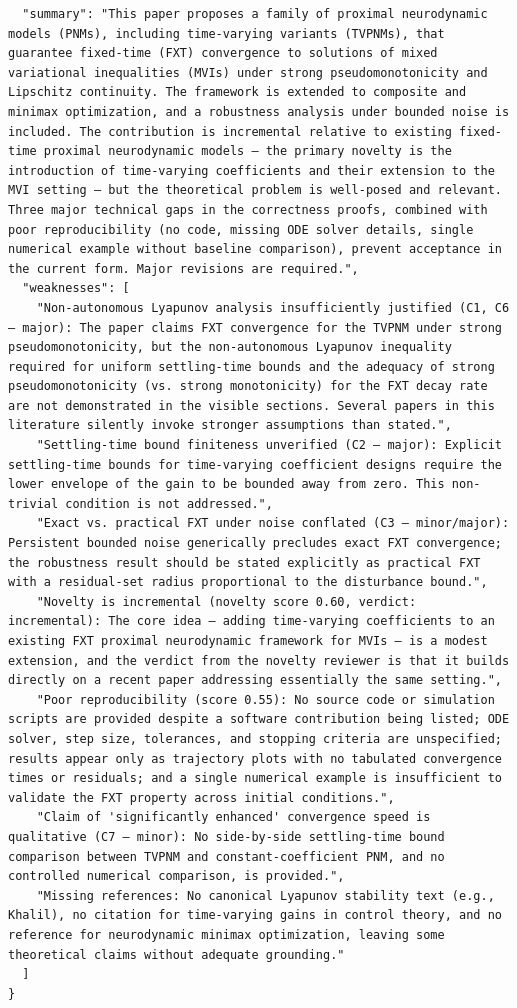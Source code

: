 \documentclass[11pt]{article}
\begin{document}
\begin{verbatim}
  "summary": "This paper proposes a family of proximal neurodynamic models (PNMs), including time-varying variants (TVPNMs), that guarantee fixed-time (FXT) convergence to solutions of mixed variational inequalities (MVIs) under strong pseudomonotonicity and Lipschitz continuity. The framework is extended to composite and minimax optimization, and a robustness analysis under bounded noise is included. The contribution is incremental relative to existing fixed-time proximal neurodynamic models — the primary novelty is the introduction of time-varying coefficients and their extension to the MVI setting — but the theoretical problem is well-posed and relevant. Three major technical gaps in the correctness proofs, combined with poor reproducibility (no code, missing ODE solver details, single numerical example without baseline comparison), prevent acceptance in the current form. Major revisions are required.",
  "weaknesses": [
    "Non-autonomous Lyapunov analysis insufficiently justified (C1, C6 — major): The paper claims FXT convergence for the TVPNM under strong pseudomonotonicity, but the non-autonomous Lyapunov inequality required for uniform settling-time bounds and the adequacy of strong pseudomonotonicity (vs. strong monotonicity) for the FXT decay rate are not demonstrated in the visible sections. Several papers in this literature silently invoke stronger assumptions than stated.",
    "Settling-time bound finiteness unverified (C2 — major): Explicit settling-time bounds for time-varying coefficient designs require the lower envelope of the gain to be bounded away from zero. This non-trivial condition is not addressed.",
    "Exact vs. practical FXT under noise conflated (C3 — minor/major): Persistent bounded noise generically precludes exact FXT convergence; the robustness result should be stated explicitly as practical FXT with a residual-set radius proportional to the disturbance bound.",
    "Novelty is incremental (novelty score 0.60, verdict: incremental): The core idea — adding time-varying coefficients to an existing FXT proximal neurodynamic framework for MVIs — is a modest extension, and the verdict from the novelty reviewer is that it builds directly on a recent paper addressing essentially the same setting.",
    "Poor reproducibility (score 0.55): No source code or simulation scripts are provided despite a software contribution being listed; ODE solver, step size, tolerances, and stopping criteria are unspecified; results appear only as trajectory plots with no tabulated convergence times or residuals; and a single numerical example is insufficient to validate the FXT property across initial conditions.",
    "Claim of 'significantly enhanced' convergence speed is qualitative (C7 — minor): No side-by-side settling-time bound comparison between TVPNM and constant-coefficient PNM, and no controlled numerical comparison, is provided.",
    "Missing references: No canonical Lyapunov stability text (e.g., Khalil), no citation for time-varying gains in control theory, and no reference for neurodynamic minimax optimization, leaving some theoretical claims without adequate grounding."
  ]
}
\end{verbatim}
\end{document}
